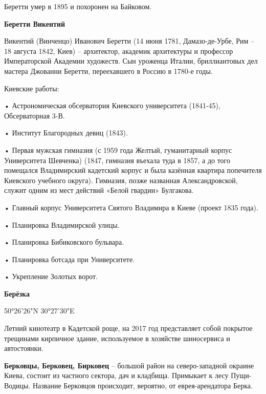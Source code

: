 Беретти умер в 1895 и похоронен на Байковом.\\


\medskip


\textbf{Беретти Викентий}

Викентий (Винченцо) Иванович Беретти (14 июня 1781, Дамазо-де-Урбе, Рим – 18 августа 1842, Киев) – архитектор, академик архитектуры и профессор Императорской Академии художеств. Сын уроженца Италии, бриллиантовых дел мастера Джованни Беретти, переехавшего в Россию в 1780-е годы.

Киевские работы:

\noindent • Астрономическая обсерватория Киевского университета (1841-45), Обсерваторная 3-В. 

\noindent • Институт Благородных девиц  (1843).

\noindent • Первая мужская гимназия (с 1959 года Желтый, гуманитарный корпус Университета Шевченка) (1847, гимназия въехала туда в 1857, а до того помещался Владимирский кадетский корпус и была казённая квартира попечителя Киевского учебного округа). Гимназия, позже названная Александровской, служит одним из мест действий «Белой гвардии» Булгакова.

\noindent • Главный корпус Университета Святого Владимира в Киеве (проект 1835 года).

\noindent • Планировка Владимирской улицы. 

\noindent • Планировка Бибиковского бульвара.

\noindent • Планировка ботсада при Университете.


\noindent • Укрепление Золотых ворот.\\

\medskip



\textbf{Берёзка} 

50°26'26"N 30°27'30"E

Летний кинотеатр в Кадетской роще, на 2017 год представляет собой покрытое трещинами кирпичное здание, используемое в хозяйстве шиносервиса и автостоянки.\\

\medskip


\textbf{Берковцы, Берковец, Бирковец} – большой район на северо-западной окраине Киева, состоит из частного сектора, дач и кладбища. Примыкает к лесу Пущи-Водицы. Название Берковцов происходит, вероятно, от еврея-арендатора Берка.


